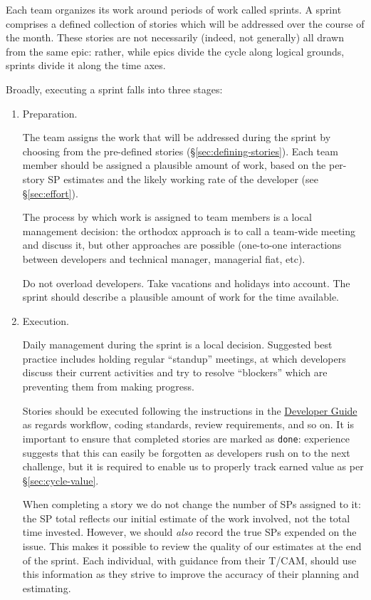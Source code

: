 Each team organizes its work around periods of work called sprints.
A sprint comprises a defined collection of stories which will be addressed over the course of the month.
These stories are not necessarily (indeed, not generally) all drawn from the same \gls{epic}: rather, while \glspl{epic} divide the \gls{cycle} along logical grounds, sprints divide it along the time axes.

Broadly, executing a sprint falls into three stages:

\begin{enumerate}
\item
  Preparation.

  The team assigns the work that will be addressed during the sprint by choosing from the pre-defined stories (\S\ref{sec:defining-stories}).
  Each team member should be assigned a plausible amount of work, based on the per-\gls{story} \gls{SP} estimates and the likely working rate of the developer (see \S\ref{sec:effort}).

  The process by which work is assigned to team members is a local
  management decision: the orthodox approach is to call a team-wide
  meeting and discuss it, but other approaches are possible (one-to-one
  interactions between developers and technical manager, managerial
  fiat, etc).

  Do not overload developers. Take vacations and holidays into account.
  The sprint should describe a plausible amount of work for the time
  available.
\item
  Execution.

  Daily management during the sprint is a local decision. Suggested best
  practice includes holding regular ``standup'' meetings, at which
  developers discuss their current activities and try to resolve
  ``blockers'' which are preventing them from making progress.

  Stories should be executed following the instructions in the
  \href{http://developer.lsst.io/}{Developer Guide} as regards workflow,
  coding standards, review requirements, and so on. It is important to
  ensure that completed stories are marked as \texttt{done}:
  experience suggests that this can easily be forgotten as developers
  rush on to the next challenge, but it is required to enable us to
  properly track earned value as per \S\ref{sec:cycle-value}.

  When completing a \gls{story} we do not change the number of \glspl{SP} assigned to
  it: the \gls{SP} total reflects our initial estimate of the work involved,
  not the total time invested.
  However, we should \textit{also} record the true \glspl{SP} expended on the issue.
  This makes it possible to review the quality of our estimates at the end of the sprint.
  Each individual, with guidance from their \gls{T/CAM}, should use this information as they strive to improve the accuracy of their planning and estimating.


\end{enumerate}
